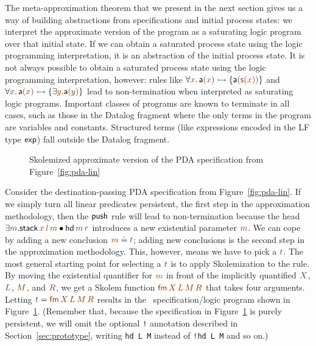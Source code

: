 The meta-approximation theorem that we present in the next section
gives us a way of building abstractions from specifications and
initial process states: we interpret the approximate version of the
program as a saturating logic program over that initial state. If we
can obtain a saturated process state using the logic programming
interpretation, it is an abstraction of the initial process state. It
is not always possible to obtain a saturated process state using the
logic programming interpretation, however: rules like $\forall
\lf{x}.\,{\sf a}\lf{(x)} \lefti \{ {\sf a}\lf{({\sf s}(x))} \}$ and
$\forall \lf{x}.\,{\sf a}\lf{(x)} \lefti \{ \exists \lf{y}. {\sf
  a}\lf{(y)} \}$ lead to non-termination when interpreted as
saturating logic programs. Important classes of programs are known to
terminate in all cases, such as those in the Datalog fragment where
the only terms in the program are variables and constants. Structured
terms (like expressions encoded in the LF type ${\sf exp}$) fall
outside the Datalog fragment.

\begin{figure}
\caption{Skolemized approximate version of the PDA specification from
Figure~\ref{fig:pda-lin}}
\label{fig:pda-pers}
\end{figure}

Consider the destination-passing PDA specification from
Figure~\ref{fig:pda-lin}. If we simply turn all linear predicates
persistent, the first step in the approximation methodology, then the
${\sf push}$ rule will lead to non-termination because the head
$\exists \lf{m}. {\sf stack}\,\lf{x}\,\lf{l}\,\lf{m} \fuse {\sf
  hd}\,\lf{m}\,\lf{r}$ introduces a new existential parameter
$\lf{m}$.  We can cope by adding a new conclusion $\lf{m} \doteq
\lf{t}$; adding new conclusions is the second step in the
approximation methodology. This, however, means we have to pick a
$\lf{t}$.  The most general starting point for selecting a $\lf{t}$ is
to apply Skolemization to the rule. By moving the existential
quantifier for $\lf{m}$ in front of the implicitly quantified
$\lf{X}$, $\lf{L}$, $\lf{M}$, and $\lf{R}$, we get a Skolem function
$\lf{{\sf fm}\,X\,L\,M\,R}$ that takes four arguments. Letting $\lf{t}
= \lf{{\sf fm}\,X\,L\,M\,R}$ results in the \sls~specification/logic
program shown in Figure~\ref{fig:pda-pers}. (Remember that, because
the specification in Figure~\ref{fig:pda-pers} is purely persistent,
we will omit the optional \verb|!| annotation described in
Section~\ref{sec:prototype}, writing \verb|hd L M| instead of
\verb|!hd L M| and so on.)

